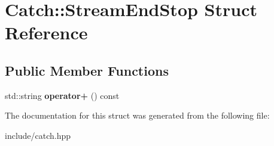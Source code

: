\hypertarget{structCatch_1_1StreamEndStop}{}\section{Catch\+:\+:Stream\+End\+Stop Struct Reference}
\label{structCatch_1_1StreamEndStop}
\subsection*{Public Member Functions}
\begin{DoxyCompactItemize}
\item 
std\+::string {\bfseries operator+} () const \hypertarget{structCatch_1_1StreamEndStop_a570db0c412a897ab2748876660428c9e}{}\label{structCatch_1_1StreamEndStop_a570db0c412a897ab2748876660428c9e}

\end{DoxyCompactItemize}


The documentation for this struct was generated from the following file\+:\begin{DoxyCompactItemize}
\item 
include/catch.\+hpp\end{DoxyCompactItemize}
